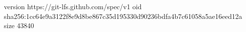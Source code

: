 version https://git-lfs.github.com/spec/v1
oid sha256:1cc64e9a3122f8e9d8be867c35d195330d90236bdfa4b7c61058a5ae16eed12a
size 43840
